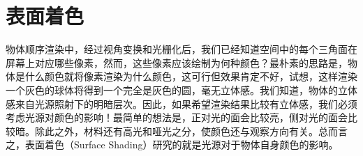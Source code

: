 \chapter{表面着色}

物体顺序渲染中，经过视角变换和光栅化后，我们已经知道空间中的每个三角面在屏幕上对应哪些像素，然而，这些像素应该绘制为何种颜色？最朴素的思路是，物体是什么颜色就将像素渲染为什么颜色，这可行但效果肯定不好，试想，这样渲染一个灰色的球体将得到一个完全是灰色的圆，毫无立体感。我们知道，物体的立体感来自光源照射下的明暗层次。因此，如果希望渲染结果比较有立体感，我们必须考虑光源对颜色的影响！最简单的想法是，正对光的面会比较亮，侧对光的面会比较暗。除此之外，材料还有高光和哑光之分，使颜色还与观察方向有关。总而言之，表面着色（Surface Shading）研究的就是光源对于物体自身颜色的影响。



